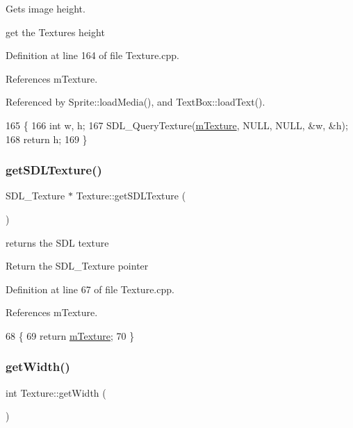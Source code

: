 Gets image height. 

get the Textures height 

Definition at line 164 of file Texture.\+cpp.



References m\+Texture.



Referenced by Sprite\+::load\+Media(), and Text\+Box\+::load\+Text().


\begin{DoxyCode}
165 \{
166     \textcolor{keywordtype}{int} w, h;
167     SDL\_QueryTexture(\hyperlink{class_texture_a28e61626f21dd1c69968e53687a13424}{mTexture}, NULL, NULL, &w, &h);
168     \textcolor{keywordflow}{return} h;
169 \}
\end{DoxyCode}
\mbox{\label{class_texture_a4c7638bab72e620b54cd8224019eb3dd}} 
\subsubsection{\texorpdfstring{get\+S\+D\+L\+Texture()}{getSDLTexture()}}
{\footnotesize\ttfamily S\+D\+L\+\_\+\+Texture $\ast$ Texture\+::get\+S\+D\+L\+Texture (\begin{DoxyParamCaption}{ }\end{DoxyParamCaption})}



returns the S\+DL texture 

Return the S\+D\+L\+\_\+\+Texture pointer 

Definition at line 67 of file Texture.\+cpp.



References m\+Texture.


\begin{DoxyCode}
68 \{
69     \textcolor{keywordflow}{return} \hyperlink{class_texture_a28e61626f21dd1c69968e53687a13424}{mTexture};
70 \}
\end{DoxyCode}
\mbox{\label{class_texture_a91a6fd3355bc870194851514194daaab}} 
\subsubsection{\texorpdfstring{get\+Width()}{getWidth()}}
{\footnotesize\ttfamily int Texture\+::get\+Width (\begin{DoxyParamCaption}{ }\end{DoxyParamCaption})}



